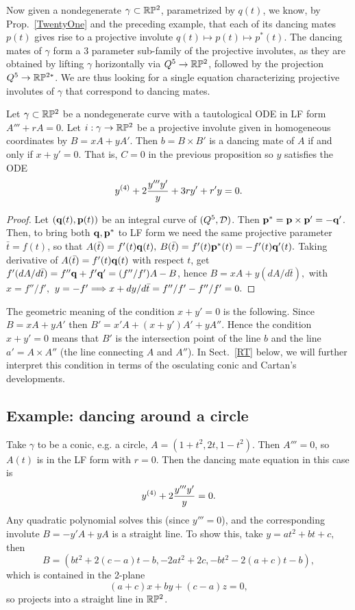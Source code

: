  Now given a nondegenerate $\gamma\subset \mathbb{R}\mathbb{P}^2$, parametrized by $q(t)$, we 
know, by Prop.~\ref{TwentyOne} and the preceding example, that each of its  dancing mates $p(t)$ gives rise to a projective involute
$q(t)\mapsto p(t)\mapsto p^*(t)$. The dancing mates of $\gamma$ form a  3 parameter sub-family of 
the projective involutes,  as they are obtained by lifting 
$\gamma$ horizontally via $Q^5\to \mathbb{R}\mathbb{P}^2$, followed by the projection $Q^5\to\mathbb{R}\mathbb{P}^{2*}$. 
We are thus looking for a single equation characterizing projective involutes of $\gamma$ that correspond to dancing mates. 
\begin{proposition}\label{TwentyThree} 
Let  $\gamma\subset \mathbb{R}\mathbb{P}^2$ be a nondegenerate curve with a tautological ODE in LF form $A'''+rA=0$. Let $i:\gamma\to\mathbb{R}\mathbb{P}^2$ be a projective involute given in homogeneous coordinates by $B=xA+yA'.$ Then $b=B\times B'$ is a dancing mate of $A$  if and only if $x+y'=0$. That is, $C=0$ in the previous proposition so  $y$ satisfies the ODE
$$y^{(4)}+2{y'''y'\over y}+3ry'+r'y=0.$$ 
\end{proposition}

\begin{proof} Let $(\mathbf q(t), {\mathbf p}(t))$ be an integral curve of $(Q^5,{\mathcal D})$. Then ${\mathbf p}^*={\mathbf p}\times {\mathbf p}'=-\mathbf q'$. Then, to bring both $\mathbf q,{\mathbf p}^*$ to LF form we
  need the same projective parameter $\bar t=f(t)$,  so that $A(\bar t)=f'(t)\mathbf q(t) ,$ $B(\bar t)=f'(t){\mathbf p}^*(t)=-f'(t)\mathbf q'(t).$ 
  Taking derivative of $A(\bar t)=f'(t)\mathbf q(t)$  with respect $t$, get $f'(dA/d\bar t)=f''\mathbf q+f'\mathbf q'=(f''/f')A-B$, 
  hence $B=xA+y(dA/d\bar t),$ with $x=f''/f',$ $y=-f'\Longrightarrow x+dy/d\bar t=f''/f'-f''/f'=0.$\end{proof}
  
\begin{rmrk}  The geometric meaning of the condition $x+y'=0$ is the following.  Since $B=xA+yA'$ then $B'=x'A+(x+y')A'+yA''$. Hence the condition $x+y'=0$ means that $B'$ is the intersection point of the line $b$ and the line $a'=A\times A''$ (the line connecting $A$ and $A''$). In Sect.~\ref{RT} below, we will further interpret this condition in terms of the osculating conic and Cartan's developments. 
 \end{rmrk}
    

\subsection{Example: dancing around a circle}\label{sec:circle}Take $\gamma$ to be a conic, e.g. a circle, $A=(1+t^2,2t,1-t^2)$. Then $A'''=0$, so $A(t) $ is in the LF form with 
 $r=0$. Then the dancing mate equation in this case is $$y^{(4)}+2{y'''y'\over y}=0.$$
  Any quadratic polynomial solves this (since  $y'''=0$),  and the corresponding involute $B=-y'A+yA$ is a straight line. To show this, take $y=at^2+bt+c,$ then 
   $$B=( bt^2+2(c-a)t-b,-2at^2+2c, -bt^2-2(a+c)t-b),$$ which  is contained in the 2-plane 
   $$(a+c)x+by+(c-a)z=0,$$ so projects into a straight line in $\mathbb{R}\mathbb{P}^2$. 

